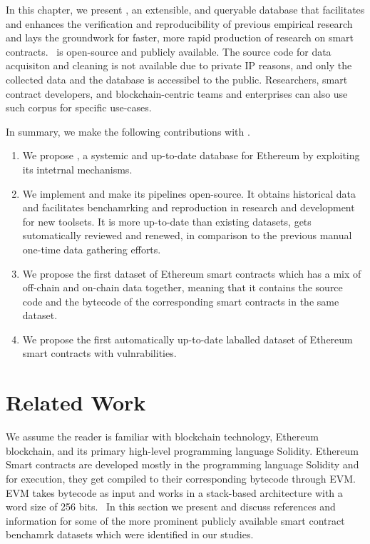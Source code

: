 	In this chapter, we present \etherbase, an extensible, and queryable database that facilitates and enhances the verification and reproducibility of previous empirical
	research and lays the groundwork for faster, more rapid production of research on smart contracts.
	\etherbase~is open-source and publicly available.
	The source code for data acquisiton and cleaning is not available due to private IP reasons, and only the collected data and the database is accessibel to the public.
	Researchers, smart contract developers, and blockchain-centric teams and enterprises can also use such corpus for specific use-cases.

	In summary, we make the following contributions with \etherbase.
	\begin{enumerate}
		\item We propose \etherbase, a systemic and up-to-date database for Ethereum by exploiting its intetrnal mechanisms.
		\item We implement \etherbase and make its pipelines open-source. It obtains historical data and facilitates benchamrking and reproduction in research and development for new toolsets. It is more up-to-date than existing datasets, gets sutomatically reviewed and renewed, in comparison to the previous manual one-time data gathering efforts.
		\item We propose the first dataset of Ethereum smart contracts which has a mix of off-chain and on-chain data together, meaning that it contains the source code and the bytecode of
		the corresponding smart contracts in the same dataset.
		\item We propose the first automatically up-to-date laballed dataset of Ethereum smart contracts with vulnrabilities.
	\end{enumerate}

\section{Related Work}
	\label{sec:relwork}
	We assume the reader is familiar with blockchain technology, Ethereum blockchain, and its primary high-level programming language Solidity.
	Ethereum Smart contracts are developed mostly in the programming language Solidity and for execution, they get compiled to their corresponding bytecode through EVM.
	EVM takes bytecode as input and works in a stack-based architecture with a word size of 256 bits.~\cite{liu2019enabling}
	In this section we present and discuss references and information for some of the more prominent publicly available smart contract benchamrk datasets which were identified in our studies.

